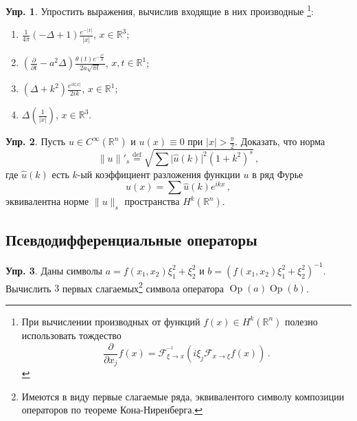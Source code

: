 \documentclass[a4paper, 12pt]{article}
\theoremstyle{definition}
\newtheorem{exercise}{Упр.}
\begin{document}
\begin{exercise} %
    Упростить выражения, вычислив входящие в них производные
    \footnote{При вычислении производных от функций \({ f(x) \in H^{k}(\mathbb R^{n}) }\) полезно использовать тождество \[
        \frac{\partial}{\partial x_j} f(x) = \mathcal F^{^{-1}}_{\xi \to x} (i\xi_{j} \mathcal F_{x \to \xi}f(x))\,.
    \]}:
    \begin{enumerate}
        \item \({ \displaystyle \frac{1}{4\pi} (- \Delta + 1) \frac{e^{-\lvert x \rvert}}{\lvert x \rvert} }\), \({ x \in \mathbb R^3 }\); \\
        \item \({ \displaystyle \left( \frac{\partial}{\partial t} - a^2 \Delta \right) \frac{\theta(t) e^{-\frac{x^2}{4t}}}{2a \sqrt{\pi t}} }\), \({ x, t \in \mathbb R^{1} }\); \\
        \item \({ \displaystyle (\Delta + k^2) \frac{e^{ik \lvert x \rvert}}{2ik} }\), \({ x \in \mathbb R^{1} }\);
        \item \({ \displaystyle \Delta\left( \frac{1}{\lvert x \rvert} \right) }\), \({ x \in \mathbb R^3 }\).
    \end{enumerate}
\end{exercise}

\begin{exercise}
    Пусть \({ u \in C^{\infty}(\mathbb R^{n}) }\) и \({ u(x) \equiv 0 }\) при \({ \lvert x \rvert > \frac{\pi}{2} }\). Доказать, что норма \[
        \lVert u \rVert'_{s} \overset{\text{def}}= \sqrt{\sum \lvert \hat{u}(k) \rvert^2 (1 + k^2)^{s}}\,,
    \] где \({ \hat{u}(k) }\) есть \({ k }\)-ый коэффициент разложения функции \({ u }\) в ряд Фурье \[
        u(x) = \sum \hat{u}(k) e^{ikx}\,,
    \] эквивалентна норме \({ \lVert u \rVert_{s} }\) пространства \({ H^{k}(\mathbb R^{n}) }\).
\end{exercise}

\subsection{Псевдодифференциальные операторы} %

\begin{exercise}
    Даны символы \({ a = f(x_1, x_2) \xi_1^2 + \xi_2^2 }\) и \({ b = \left( f(x_1, x_2) \xi_1^2 + \xi_2^2 \right)^{-1} }\). Вычислить \({ 3 }\) первых слагаемых\footnote{Имеются в виду первые слагаемые ряда, эквивалентого символу композиции операторов по теореме Кона-Ниренберга.} символа оператора \({ \operatorname{Op}(a) \operatorname{Op}(b) }\).
\end{exercise}
\end{document}
